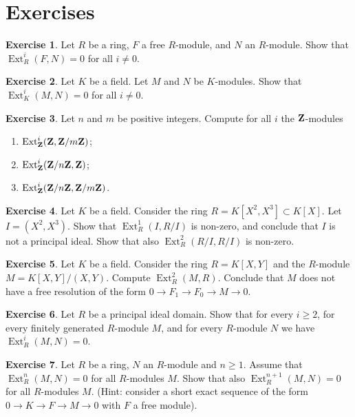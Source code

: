 \documentclass[11pt]{amsbook}
\DeclareMathOperator\Ext{Ext}
\theoremstyle{plain}
\theoremstyle{definition}
\newtheorem{exercise}{Exercise}
\begin{document}
\newpage
\section*{Exercises}

\begin{exercise}
Let $R$ be a ring, $F$ a free $R$-module, and $N$ an $R$-module. Show that $\Ext^i_R(F,N)=0$ for all $i\neq 0$.
\end{exercise}

\begin{exercise}
Let $K$ be a field. Let $M$ and $N$ be $K$-modules. Show that $\Ext^i_K(M,N)=0$ for all $i\neq 0$.
\end{exercise}



\begin{exercise}
Let $n$ and $m$ be positive integers. Compute for all $i$ the ${\mathbf{Z}}$-modules
\begin{enumerate}
\item $\Ext^i_\bZ(\bZ,\bZ/m\bZ)$;
\item $\Ext^i_\bZ(\bZ/n\bZ,\bZ)$;
\item $\Ext^i_\bZ(\bZ/n\bZ,\bZ/m\bZ)$.
\end{enumerate}
\end{exercise}

\begin{exercise}
Let $K$ be a field.
Consider the ring $R=K[X^2,X^3] \subset K[X]$. Let $I=(X^2,X^3)$. Show that $\Ext^1_R(I,R/I)$ is non-zero, and conclude that $I$ is not a principal ideal. Show that also $\Ext^2_R(R/I,R/I)$ is non-zero.
\end{exercise}

\begin{exercise}
Let $K$ be a field. Consider the ring $R=K[X,Y]$ and the $R$-module $M=K[X,Y]/(X,Y)$. Compute $\Ext^2_R(M,R)$. Conclude that $M$ does not have a free resolution of the form $0\to F_1 \to F_0 \to M \to 0$.
\end{exercise}


\begin{exercise}
Let $R$ be a principal ideal domain. Show that for every $i\geq 2$, for every finitely generated $R$-module $M$,
and for every $R$-module $N$ we have $\Ext^i_R(M,N)=0$.
\end{exercise}


\begin{exercise}Let $R$ be a ring, $N$ an $R$-module and $n\geq 1$. Assume that $\Ext^n_R(M,N)=0$ for all $R$-modules $M$. Show that also $\Ext^{n+1}_R(M,N)=0$ for all $R$-modules $M$. (Hint: consider a short exact sequence of the form $0 \to K \to F \to M \to 0$ with $F$ a free module). 
\end{exercise}
\end{document}
